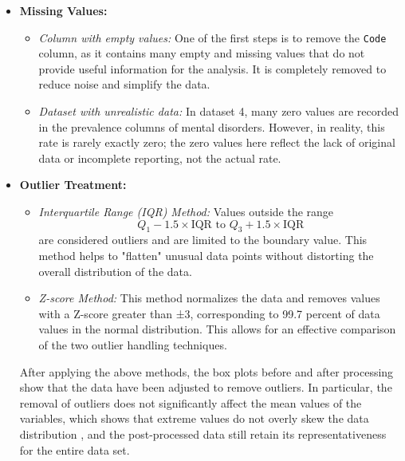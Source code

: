\begin{itemize}

     \item \textbf{Missing Values:}
     
     \begin{itemize}
        \item \textit{Column with empty values:} One of the first steps is to remove the \texttt{Code} column, as it contains many empty and missing values that do not provide useful information for the analysis. It is completely removed to reduce noise and simplify the data.
    
        \item \textit{Dataset with unrealistic data:} In dataset 4, many zero values are recorded in the prevalence columns of mental disorders. However, in reality, this rate is rarely exactly zero; the zero values here reflect the lack of original data or incomplete reporting, not the actual rate.
    \end{itemize}
    
    \item \textbf{Outlier Treatment:}
    
        \begin{itemize}
            \item \textit{Interquartile Range (IQR) Method:} Values outside the range
             \[
             Q_1 - 1.5 \times \text{IQR} \text{ to } Q_3 + 1.5 \times \text{IQR} 
             \] 
             are considered outliers and are limited to the boundary value. This method helps to "flatten" unusual data points without distorting the overall distribution of the data.
            
            \item \textit{Z-score Method:} This method normalizes the data and removes values with a Z-score greater than ±3, corresponding to 99.7 percent of data values in the normal distribution. This allows for an effective comparison of the two outlier handling techniques.
        \end{itemize}
        
    After applying the above methods, the box plots before and after processing show that the data have been adjusted to remove outliers. In particular, the removal of outliers does not significantly affect the mean values of the variables, which shows that extreme values do not overly skew the data distribution , and the post-processed data still retain its representativeness for the entire data set.
    
\end{itemize}

